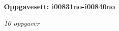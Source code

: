\centerline{\bf Oppgavesett: i00831no-i00840no}
\vskip 10pt
\centerline{\it 10 oppgaver}\vskip 10pt
\vskip 10pt
